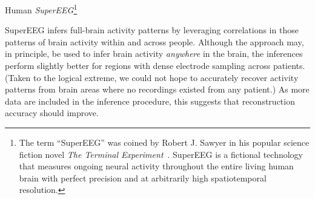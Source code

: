 Human \textit{SuperEEG}\footnote{The term ``SuperEEG'' was coined by
    Robert J. Sawyer in his popular science fiction novel \textit{The
      Terminal Experiment}~\cite{Sawy95}.  SuperEEG is a fictional
    technology that measures ongoing
  neural activity throughout the entire living human brain with perfect
  precision and at arbitrarily high spatiotemporal resolution.}

  
SuperEEG infers full-brain activity patterns by leveraging
correlations in those patterns of brain activity within and across people.  Although
the approach may, in principle, be used to infer brain activity
\textit{anywhere} in the brain, the inferences perform slightly better for
regions with dense electrode sampling across patients.  (Taken to the logical extreme, we could not hope to accurately recover activity patterns from brain areas where no recordings existed from any patient.)   As more data
are included in the inference procedure, this suggests that reconstruction accuracy should improve.


